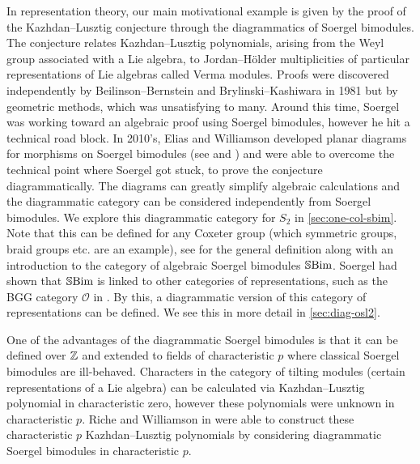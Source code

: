 In representation theory, our main motivational example is given by the proof of the Kazhdan--Lusztig conjecture through the diagrammatics of Soergel bimodules. The conjecture relates Kazhdan--Lusztig polynomials, arising from the Weyl group associated with a Lie algebra, to Jordan--H\"older multiplicities of particular representations of Lie algebras called Verma modules. Proofs were discovered independently by Beilinson--Bernstein and Brylinski--Kashiwara in 1981 but by geometric methods, which was unsatisfying to many. Around this time, Soergel was working toward an algebraic proof using Soergel bimodules, however he hit a technical road block. In 2010's, Elias and Williamson developed planar diagrams for morphisms on Soergel bimodules (see \cite{hodge-theory-of-soergel-bimodules} and \cite{diagrammatics-for-soergel-categories}) and were able to overcome the technical point where Soergel got stuck, to prove the conjecture diagrammatically. The diagrams can greatly simplify algebraic calculations and the diagrammatic category can be considered independently from Soergel bimodules. We explore this diagrammatic category for $S_2$ in \autoref{sec:one-col-sbim}. Note that this can be defined for any Coxeter group (which symmetric groups, braid groups etc. are an example), see \cite{intro-soergel-bimodules} for the general definition along with an introduction to the category of algebraic Soergel bimodules $\operatorname{\mathbb{S}Bim}$. Soergel had shown that $\operatorname{\mathbb{S}Bim}$ is linked to other categories of representations, such as the BGG category $\mathcal{O}$ in \cite{soergel-category-O}. By this, a diagrammatic version of this category of representations can be defined. We see this in more detail in \autoref{sec:diag-osl2}.

One of the advantages of the diagrammatic Soergel bimodules is that it can be defined over $\mathbb{Z}$ and extended to fields of characteristic $p$ where classical Soergel bimodules are ill-behaved. Characters in the category of tilting modules (certain representations of a Lie algebra) can be calculated via Kazhdan--Lusztig polynomial in characteristic zero, however these polynomials were unknown in characteristic $p$. Riche and Williamson in \cite{riche-williamson-tilt-modules-p-canon-basis} were able to construct these characteristic $p$ Kazhdan--Lusztig polynomials by considering diagrammatic Soergel bimodules in characteristic $p$.

